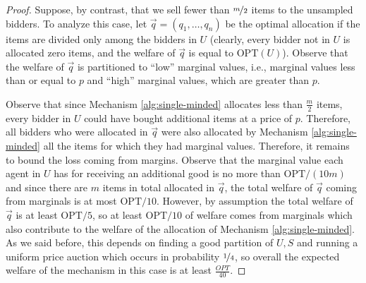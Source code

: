 \begin{proof}
    
    Suppose, by contrast, that we sell fewer than $\nicefrac m 2$ items to the unsampled bidders.  
    To analyze this case, let $\vec{q}=(q_1,\dots,q_n)$ be the optimal allocation if the items are divided only among the bidders in $U$ (clearly, every bidder not in $U$ is allocated zero items, and the welfare of $\vec q$ is equal to $\text{OPT}(U)$). 
    Observe that the welfare of $\vec q$
is partitioned to ``low'' marginal values, i.e., marginal values less than or equal to $p$ and ``high'' marginal values, which are greater than $p$.

Observe that since Mechanism \ref{alg:single-minded} allocates less than $\frac m 2$ items, every bidder in  $U$  could have bought additional items at a price of $p$. Therefore, all bidders who were allocated in $\vec q$ were also allocated by Mechanism \ref{alg:single-minded} all the items for which they had  marginal values. Therefore, it remains to bound the loss coming from  margins. Observe that the marginal value each agent in $U$ has for receiving an additional good is no more than $\text{OPT}/(10m)$ and since there are $m$ items in total allocated in $\vec q$, the total welfare of $\vec q$ coming from  marginals is at most $\text{OPT}/10$. However, by assumption the total welfare of $\vec q$ is at least $\text{OPT}/5$,  so at least 
$\text{OPT}/10$ of welfare comes from  marginals which also contribute to the welfare of the allocation of Mechanism \ref{alg:single-minded}. As we said before, this 
depends on finding a good partition of $U,S$ and running a uniform price auction which occurs in probability $\nicefrac{1}{4}$, 
so overall the expected welfare of the mechanism in this case is at least $\frac{OPT}{40}$. 
    

    
    
    


    

\end{proof}
